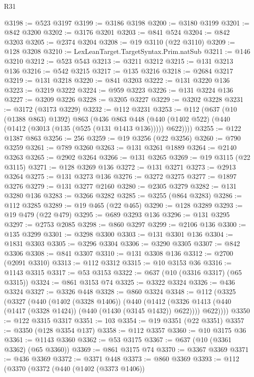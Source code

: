 \begin{lexlean}{R31}
\begin{coremodule}
@3198 := @523 @3197
@3199 := @3186 @3198
@3200 := @3180 @3199
@3201 := @842 @3200
@3202 := @3176 @3201
@3203 := @841 @524
@3204 := @842 @3203
@3205 := @2374 @3204
@3208 := @19 @3110 (@22 @3110)
@3209 := @128 @3208
@3210 := LexLeanTarget.TargetSyntax.Prim.natSub
@3211 := @146 @3210
@3212 := @523 @543
@3213 := @3211 @3212
@3215 := @131 @3213 @136
@3216 := @542 @3215
@3217 := @135 @3216
@3218 := @2684 @3217
@3219 := @131 @3218
@3220 := @841 @3203
@3222 := @131 @3220 @136
@3223 := @3219 @3222
@3224 := @959 @3223
@3226 := @131 @3224 @136
@3227 := @3209 @3226
@3228 := @3205 @3227
@3229 := @3202 @3228
@3231 := @3172 (@3173 @3229)
@3232 := @112 @3231
@3253 := @112
    (@637
      (@10 (@1388 @863) @1392)
      @863
      (@436
        @863
        @448
        (@440 (@1402 @522) (@440 (@1412 (@3013 (@135 (@525 (@131 @1413 @136))))) @622))))
@3255 := @122 @1387 @863
@3256 := 256
@3259 := @19 @3256 (@22 @3256)
@3260 := @790 @3259
@3261 := @789 @3260
@3263 := @131 @3261 @1889
@3264 := @2140 @3263
@3265 := @2902 @3264
@3266 := @131 @3265
@3269 := @19 @3115 (@22 @3115)
@3271 := @128 @3269 @136
@3272 := @131 @3271
@3273 := @2913 @3264
@3275 := @131 @3273 @136
@3276 := @3272 @3275
@3277 := @1897 @3276
@3279 := @131 @3277 @2160
@3280 := @2305 @3279
@3282 := @131 @3280 @136
@3283 := @3266 @3282
@3285 := @3255 (@864 @3283)
@3286 := @112 @3285
@3289 := @19 @465 (@22 @465)
@3290 := @128 @3289
@3293 := @19 @479 (@22 @479)
@3295 := @689 @3293 @136
@3296 := @131 @3295
@3297 := @2753 @2085
@3298 := @860 @3297
@3299 := @2106 @136
@3300 := @135 @3299
@3301 := @3298 @3300
@3303 := @131 @3301 @136
@3304 := @1831 @3303
@3305 := @3296 @3304
@3306 := @3290 @3305
@3307 := @842 @3306
@3308 := @841 @3307
@3310 := @131 @3308 @136
@3312 := @2700 (@2091 @3310)
@3313 := @112 @3312
@3315 := @10 @3153 @36
@3316 := @1143 @3315
@3317 := @53 @3153
@3322 := @637 (@10 (@3316 @3317) (@65 @3315))
@3324 := @861 @3153 @74
@3325 := @3322 @3324
@3326 := @436 @3324
@3327 := @3326 @448
@3328 := @860 @3324
@3348 := @112
    (@3325
      (@3327
        (@440
          (@1402 (@3328 @1406))
          (@440
            (@1412 (@3326 @1413 (@440 (@1417 (@3328 @1424)) (@440 (@1430 (@3145 @1432)) @622))))
            @622))))
@3350 := @122 @3315 @3317
@3351 := 103
@3354 := @19 @3351 (@22 @3351)
@3357 := @3350 (@128 @3354 @137)
@3358 := @112 @3357
@3360 := @10 @3175 @36
@3361 := @1143 @3360
@3362 := @53 @3175
@3367 := @637 (@10 (@3361 @3362) (@65 @3360))
@3369 := @861 @3175 @74
@3370 := @3367 @3369
@3371 := @436 @3369
@3372 := @3371 @448
@3373 := @860 @3369
@3393 := @112
    (@3370
      (@3372
        (@440
          (@1402 (@3373 @1406))

\end{coremodule}
\end{lexlean}
